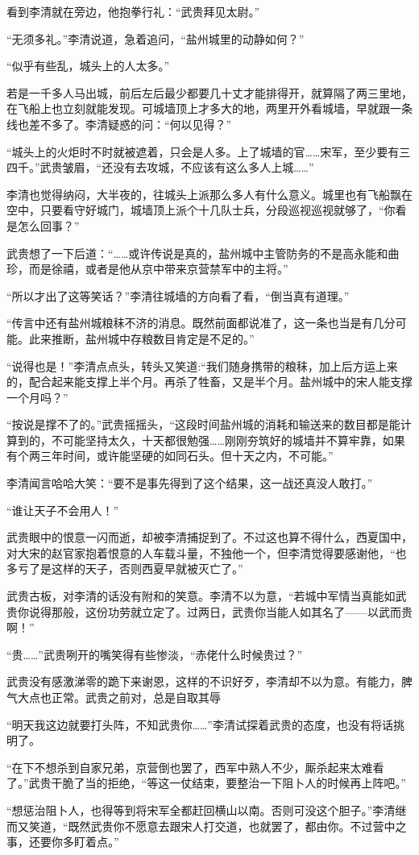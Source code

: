 看到李清就在旁边，他抱拳行礼：“武贵拜见太尉。”

“无须多礼。”李清说道，急着追问，“盐州城里的动静如何？”

“似乎有些乱，城头上的人太多。”

若是一千多人马出城，前后左后最少都要几十丈才能排得开，就算隔了两三里地，在飞船上也立刻就能发现。可城墙顶上才多大的地，两里开外看城墙，早就跟一条线也差不多了。李清疑惑的问：“何以见得？”

“城头上的火炬时不时就被遮着，只会是人多。上了城墙的官……宋军，至少要有三四千。”武贵皱眉，“还没有去攻城，不应该有这么多人上城……”

李清也觉得纳闷，大半夜的，往城头上派那么多人有什么意义。城里也有飞船飘在空中，只要看守好城门，城墙顶上派个十几队士兵，分段巡视巡视就够了，“你看是怎么回事？”

武贵想了一下后道：“……或许传说是真的，盐州城中主管防务的不是高永能和曲珍，而是徐禧，或者是他从京中带来京营禁军中的主将。”

“所以才出了这等笑话？”李清往城墙的方向看了看，“倒当真有道理。”

“传言中还有盐州城粮秣不济的消息。既然前面都说准了，这一条也当是有几分可能。此来推断，盐州城中存粮数目肯定是不足的。”

“说得也是！”李清点点头，转头又笑道:“我们随身携带的粮秣，加上后方运上来的，配合起来能支撑上半个月。再杀了牲畜，又是半个月。盐州城中的宋人能支撑一个月吗？”

“按说是撑不了的。”武贵摇摇头，“这段时间盐州城的消耗和输送来的数目都是能计算到的，不可能坚持太久，十天都很勉强……刚刚夯筑好的城墙并不算牢靠，如果有个两三年时间，或许能坚硬的如同石头。但十天之内，不可能。”

李清闻言哈哈大笑：“要不是事先得到了这个结果，这一战还真没人敢打。”

“谁让天子不会用人！”

武贵眼中的恨意一闪而逝，却被李清捕捉到了。不过这也算不得什么，西夏国中，对大宋的赵官家抱着恨意的人车载斗量，不独他一个，但李清觉得要感谢他，“也多亏了是这样的天子，否则西夏早就被灭亡了。”

武贵古板，对李清的话没有附和的笑意。李清不以为意，“若城中军情当真能如武贵你说得那般，这份功劳就立定了。过两日，武贵你当能人如其名了——以武而贵啊！”

“贵……”武贵咧开的嘴笑得有些惨淡，“赤佬什么时候贵过？”

武贵没有感激涕零的跪下来谢恩，这样的不识好歹，李清却不以为意。有能力，脾气大点也正常。武贵之前对，总是自取其辱

“明天我这边就要打头阵，不知武贵你……”李清试探着武贵的态度，也没有将话挑明了。

“在下不想杀到自家兄弟，京营倒也罢了，西军中熟人不少，厮杀起来太难看了。”武贵干脆了当的拒绝，“等这一仗结束，要整治一下阻卜人的时候再上阵吧。”

“想惩治阻卜人，也得等到将宋军全都赶回横山以南。否则可没这个胆子。”李清继而又笑道，“既然武贵你不愿意去跟宋人打交道，也就罢了，都由你。不过营中之事，还要你多盯着点。”

